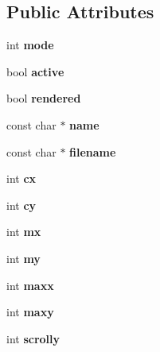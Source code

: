 \subsection*{Public Attributes}
\begin{DoxyCompactItemize}
\item 
\mbox{\label{structeditor_a28a82e6cd5f3f9ddfff752cabe7ad1ef}} 
int {\bfseries mode}
\item 
\mbox{\label{structeditor_afbae92cf046700ca6e65eca8d470ede7}} 
bool {\bfseries active}
\item 
\mbox{\label{structeditor_a9a4395bb5cb85cc2d534c251ffa52bea}} 
bool {\bfseries rendered}
\item 
\mbox{\label{structeditor_a22f369dd45964527fa9cfdb8cd01e28b}} 
const char $\ast$ {\bfseries name}
\item 
\mbox{\label{structeditor_a98b321e8ecd8cc9dc802233d7c5d2253}} 
const char $\ast$ {\bfseries filename}
\item 
\mbox{\label{structeditor_a3555bb91667bd7825daa738ffe800239}} 
int {\bfseries cx}
\item 
\mbox{\label{structeditor_a2ab02b4d78fe909b6f2c1c8b55969bdd}} 
int {\bfseries cy}
\item 
\mbox{\label{structeditor_ad47e36e2479ec1ad5b8c33aa5bdeebb9}} 
int {\bfseries mx}
\item 
\mbox{\label{structeditor_a5759712451f062dc5942aa1d452c4b57}} 
int {\bfseries my}
\item 
\mbox{\label{structeditor_a2b728cc5938b2dc0acda99554628b5f1}} 
int {\bfseries maxx}
\item 
\mbox{\label{structeditor_ad318edcb8171bc7d56852cab53002395}} 
int {\bfseries maxy}
\item 
\mbox{\label{structeditor_a3ab0fe5870f10f8dd7471122a3bbc2a6}} 
int {\bfseries scrolly}
\item 

\end{DoxyCompactItemize}
